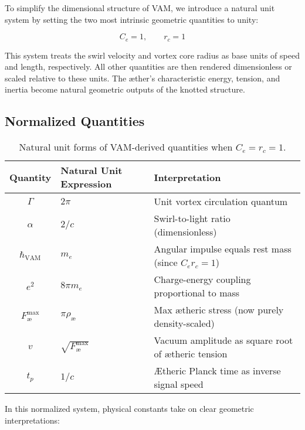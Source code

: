 To simplify the dimensional structure of VAM, we introduce a natural unit system by setting the two most intrinsic geometric quantities to unity:

\[
C_e = 1, \qquad r_c = 1
\]

This system treats the swirl velocity and vortex core radius as base units of speed and length, respectively. All other quantities are then rendered dimensionless or scaled relative to these units. The æther's characteristic energy, tension, and inertia become natural geometric outputs of the knotted structure.

\subsection*{Normalized Quantities}

\begin{table}[H]
    \centering
    \footnotesize
    \renewcommand{\arraystretch}{1.3}
    \begin{tabular}{|c|l|l|}
        \hline
        \textbf{Quantity} & \textbf{Natural Unit Expression} & \textbf{Interpretation} \\
        \hline
        \( \Gamma \) & \( 2\pi \) & Unit vortex circulation quantum \\
        \hline
        \( \alpha \) & \( 2 / c \) & Swirl-to-light ratio (dimensionless) \\
        \hline
        \( \hbar_{\text{VAM}} \) & \( m_e \) & Angular impulse equals rest mass (since \( C_e r_c = 1 \)) \\
        \hline
        \( e^2 \) & \( 8\pi m_e \) & Charge-energy coupling proportional to mass \\
        \hline
        \( F^{\text{max}}_{\text{\ae}} \) & \( \pi \rho_\text{\ae} \) & Max ætheric stress (now purely density-scaled) \\
        \hline
        \( v \) & \( \sqrt{F^{\text{max}}_{\text{\ae}}} \) & Vacuum amplitude as square root of ætheric tension \\
        \hline
        \( t_p \) & \( 1/c \) & Ætheric Planck time as inverse signal speed \\
        \hline
    \end{tabular}
    \caption{Natural unit forms of VAM-derived quantities when \( C_e = r_c = 1 \).}
    \label{tab:natural_units_vam}
\end{table}

\noindent In this normalized system, physical constants take on clear geometric interpretations:

